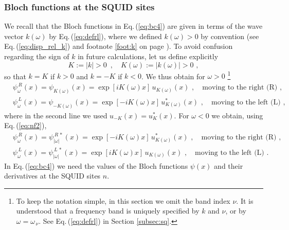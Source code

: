
\subsubsection{Bloch functions at the SQUID sites} \label{subsubsec:bloch_functions}
%
We recall that the Bloch functions in Eq.\,(\ref{eq:bc4}) are given in terms of the wave vector $k(\omega)$
by Eq.\,(\ref{eq:defrl}), where we defined $k(\omega)>0$ by convention 
(see Eq.\,(\ref{eq:disp_rel_k}) and footnote \ref{foot:k} on page \pageref{foot:k}). 
To avoid confusion regarding the sign of $k$ in future calculations, let us define
explicitly 
%
\begin{equation} \label{eq:kdef}
K := |k| > 0 \, \, \, , \quad K(\omega) := |k(\omega)| > 0 \, \, ,
\end{equation}
%
so that $k = K$ if $k>0$ and $k = - K$ if $k<0$. We thus obtain for $\omega>0$
%
\footnote{To keep the notation simple, in this section we omit the band index $\nu$. It is 
understood that a frequency band is uniquely specified by $k$ and $\nu$, or by 
$\omega = \omega_{\,\nu}$. See Eq.\,(\ref{eq:defrl}) in Section \ref{subsec:sq}.}
%
\begin{subequations} \label{eq:bloch3}
\begin{eqnarray}
& \psi_{\omega}^{\,R}(x) = \psi_{K(\omega)}(x) = \exp\left[i K(\omega) x\right] \, u_{K(\omega)}(x)
\, \, , \quad \text{moving to the right (R)} \, \, , \\[2mm]
& \psi_{\omega}^{\,L}(x) = \psi_{-K(\omega)}(x) = \exp\left[- i K(\omega) x\right] \, u_{K(\omega)}^*(x)
\, \, , \quad \text{moving to the left (L)} \, \, ,
\end{eqnarray}
\end{subequations}
%
where in the second line we used $u_{-K}(x) = u_K^*(x)$. For $\omega<0$ we obtain, 
using Eq.\,(\ref{eq:nf2}),
%
\begin{subequations} \label{eq:bloch3_neg}
\begin{eqnarray}
& \psi_{\omega}^{\,R}(x) = \psi_{|\omega|}^{\,R \, *}(x)
= \exp\left[- i K(\omega) x \right] \, u_{K(\omega)}^*(x) 
\, \, , \quad \text{moving to the right (R)} \, \, , \\[2mm]
& \psi_{\omega}^{\,L}(x) = \psi_{|\omega|}^{\,L \, *}(x)
= \exp\left[i K(\omega) x \right] \, u_{K(\omega)}(x) 
\, \, , \quad \text{moving to the left (L)} \, \, .
\end{eqnarray}
\end{subequations}
%
In Eq.\,(\ref{eq:bc4}) we need the values of the Bloch functions $\psi(x)$ and their derivatives at the SQUID sites $n$.  
